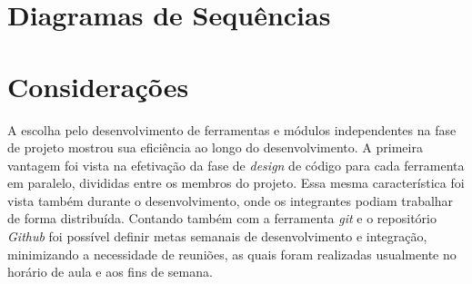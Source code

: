 \section{Diagramas de Sequências}
\section{Considerações}

A escolha pelo desenvolvimento de ferramentas e módulos independentes na fase de projeto mostrou sua eficiência ao longo do desenvolvimento. 
A primeira vantagem foi vista na efetivação da fase de \emph{design} de código para cada ferramenta em paralelo, divididas entre os membros do projeto.
Essa mesma característica foi vista também durante o desenvolvimento, onde os integrantes podiam trabalhar de forma distribuída.
Contando também com a ferramenta \emph{git} e o repositório \emph{Github} foi possível definir metas semanais de desenvolvimento e integração, minimizando a necessidade de reuniões, as quais foram realizadas usualmente no horário de aula e aos fins de semana.
